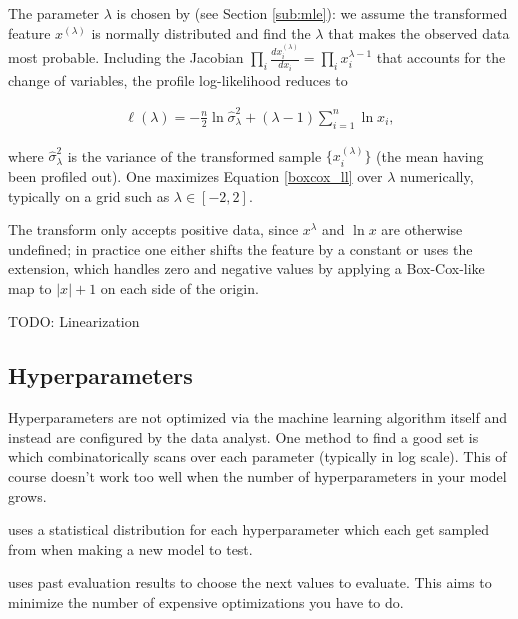 The parameter $\lambda$ is chosen by  (see Section \ref{sub:mle}): we assume the transformed feature $x^{(\lambda)}$ is normally distributed and find the $\lambda$ that makes the observed data most probable. Including the Jacobian $\prod_i \frac{dx^{(\lambda)}_i}{dx_i} = \prod_i x_i^{\lambda - 1}$ that accounts for the change of variables, the profile log-likelihood reduces to

\begin{align}\label{boxcox_ll}
	\ell(\lambda) = -\frac{n}{2}\ln \hat\sigma^2_\lambda + (\lambda - 1)\sum_{i=1}^n \ln x_i,
\end{align}

where $\hat\sigma^2_\lambda$ is the variance of the transformed sample $\{x^{(\lambda)}_i\}$ (the mean having been profiled out). One maximizes Equation \ref{boxcox_ll} over $\lambda$ numerically, typically on a grid such as $\lambda \in [-2, 2]$.

The transform only accepts positive data, since $x^\lambda$ and $\ln x$ are otherwise undefined; in practice one either shifts the feature by a constant or uses the  extension, which handles zero and negative values by applying a Box-Cox-like map to $|x|+1$ on each side of the origin.

 TODO: Linearization


\subsection{Hyperparameters}

Hyperparameters are not optimized via the machine learning algorithm itself and instead are configured by the data analyst. One method to find a good set is  which combinatorically scans over each parameter (typically in log scale). This of course doesn't work too well when the number of hyperparameters in your model grows. 

 uses a statistical distribution for each hyperparameter which each get sampled from when making a new model to test.

 uses past evaluation results to choose the next values to evaluate. This aims to minimize the number of expensive optimizations you have to do.






